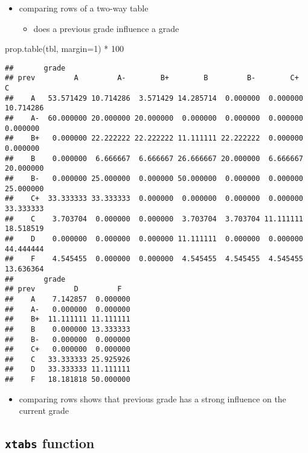 \documentclass[
]{book}
\newenvironment{Shaded}{\begin{snugshade}}{\end{snugshade}}
\newcommand{\AttributeTok}[1]{\textcolor[rgb]{0.77,0.63,0.00}{#1}}
\newcommand{\DecValTok}[1]{\textcolor[rgb]{0.00,0.00,0.81}{#1}}
\newcommand{\FunctionTok}[1]{\textcolor[rgb]{0.00,0.00,0.00}{#1}}
\newcommand{\NormalTok}[1]{#1}
\newcommand{\SpecialCharTok}[1]{\textcolor[rgb]{0.00,0.00,0.00}{#1}}
\providecommand{\tightlist}{%
  \setlength{\itemsep}{0pt}\setlength{\parskip}{0pt}}
\theoremstyle{definition}
\theoremstyle{definition}
\theoremstyle{definition}
\theoremstyle{definition}
\theoremstyle{remark}
\begin{document}
\begin{itemize}
\tightlist
\item
  comparing rows of a two-way table

  \begin{itemize}
  \tightlist
  \item
    does a previous grade influence a grade
  \end{itemize}
\end{itemize}

\begin{Shaded}
\begin{Highlighting}[]
\FunctionTok{prop.table}\NormalTok{(tbl, }\AttributeTok{margin=}\DecValTok{1}\NormalTok{) }\SpecialCharTok{*} \DecValTok{100}
\end{Highlighting}
\end{Shaded}

\begin{verbatim}
##       grade
## prev         A         A-        B+        B         B-        C+        C  
##    A   53.571429 10.714286  3.571429 14.285714  0.000000  0.000000 10.714286
##    A-  60.000000 20.000000 20.000000  0.000000  0.000000  0.000000  0.000000
##    B+   0.000000 22.222222 22.222222 11.111111 22.222222  0.000000  0.000000
##    B    0.000000  6.666667  6.666667 26.666667 20.000000  6.666667 20.000000
##    B-   0.000000 25.000000  0.000000 50.000000  0.000000  0.000000 25.000000
##    C+  33.333333 33.333333  0.000000  0.000000  0.000000  0.000000 33.333333
##    C    3.703704  0.000000  0.000000  3.703704  3.703704 11.111111 18.518519
##    D    0.000000  0.000000  0.000000 11.111111  0.000000  0.000000 44.444444
##    F    4.545455  0.000000  0.000000  4.545455  4.545455  4.545455 13.636364
##       grade
## prev         D         F  
##    A    7.142857  0.000000
##    A-   0.000000  0.000000
##    B+  11.111111 11.111111
##    B    0.000000 13.333333
##    B-   0.000000  0.000000
##    C+   0.000000  0.000000
##    C   33.333333 25.925926
##    D   33.333333 11.111111
##    F   18.181818 50.000000
\end{verbatim}

\begin{itemize}
\tightlist
\item
  comparing rows shows that previous grade has a strong influence on the current grade
\end{itemize}

\hypertarget{xtabs-function}{%
\subsection{\texorpdfstring{\texttt{xtabs} function}{xtabs function}}\label{xtabs-function}}
\end{document}

